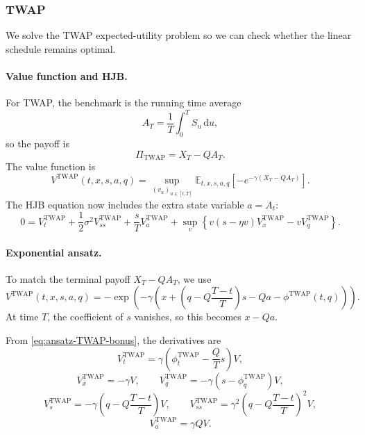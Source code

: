 \documentclass[12pt, a4paper]{article}
\newcommand{\E}{\mathbb{E}}
\newcommand{\dd}{\,\mathrm{d}}
\begin{document}
\subsubsection{TWAP}

We solve the TWAP expected-utility problem so we can check whether the linear schedule remains optimal.

\paragraph{Value function and HJB.}
For TWAP, the benchmark is the running time average
\[
  A_T = \frac{1}{T}\int_0^T S_u \dd u,
\]
so the payoff is
\[
  \Pi_{\mathrm{TWAP}} = X_T - QA_T.
\]
The value function is
\begin{equation}
  V^{\mathrm{TWAP}}(t,x,s,a,q)
  =
  \sup_{(v_u)_{u \in [t,T]}}
  \E_{t,x,s,a,q}\!\left[-e^{-\gamma(X_T-QA_T)}\right].
  \label{eq:V-TWAP-bonus}
\end{equation}
The HJB equation now includes the extra state variable $a=A_t$:
\begin{equation}
  0
  =
  V_t^{\mathrm{TWAP}}
  +
  \frac{1}{2}\sigma^2 V_{ss}^{\mathrm{TWAP}}
  +
  \frac{s}{T}V_a^{\mathrm{TWAP}}
  +
  \sup_v
  \left\{
    v(s-\eta v)V_x^{\mathrm{TWAP}} - vV_q^{\mathrm{TWAP}}
  \right\}.
  \label{eq:HJB-TWAP-bonus}
\end{equation}

\paragraph{Exponential ansatz.}
To match the terminal payoff $X_T-QA_T$, we use
\begin{equation}
  V^{\mathrm{TWAP}}(t,x,s,a,q)
  =
  -\exp\!\left(
    -\gamma\left(
      x+\left(q-Q\frac{T-t}{T}\right)s-Qa-\phi^{\mathrm{TWAP}}(t,q)
    \right)
  \right).
  \label{eq:ansatz-TWAP-bonus}
\end{equation}
At time $T$, the coefficient of $s$ vanishes, so this becomes
$x-Qa$.

From \eqref{eq:ansatz-TWAP-bonus}, the derivatives are
\[
  V_t^{\mathrm{TWAP}}
  =
  \gamma\left(\phi_t^{\mathrm{TWAP}}-\frac{Q}{T}s\right)V,
\]
\[
  V_x^{\mathrm{TWAP}} = -\gamma V,
  \qquad
  V_q^{\mathrm{TWAP}} = -\gamma(s-\phi_q^{\mathrm{TWAP}})V,
\]
\[
  V_s^{\mathrm{TWAP}}
  =
  -\gamma\left(q-Q\frac{T-t}{T}\right)V,
  \qquad
  V_{ss}^{\mathrm{TWAP}}
  =
  \gamma^2\left(q-Q\frac{T-t}{T}\right)^2V,
\]
\[
  V_a^{\mathrm{TWAP}} = \gamma QV.
\]
\end{document}

